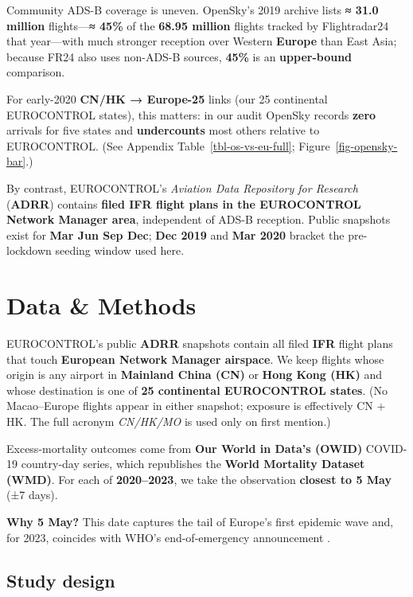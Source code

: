 \documentclass[
  authoryear,
  preprint,
  3p,
  onecolumn]{elsarticle}
\begin{document}
Community ADS-B coverage is uneven. OpenSky's 2019 archive lists
\textbf{≈ 31.0 million} flights---\textbf{≈ 45\%} of the \textbf{68.95
million} flights tracked by Flightradar24 that year---with much stronger
reception over Western \textbf{Europe} than East Asia; because FR24 also
uses non-ADS-B sources, \textbf{45\%} is an \textbf{upper-bound}
comparison. \citep{strohmeier2021}

For early-2020 \textbf{CN/HK → Europe-25} links (our 25 continental
EUROCONTROL states), this matters: in our audit OpenSky records
\textbf{zero} arrivals for five states and \textbf{undercounts} most
others relative to EUROCONTROL. (See Appendix
Table~\ref{tbl-os-vs-eu-full}; Figure~\ref{fig-opensky-bar}.)

By contrast, EUROCONTROL's \emph{Aviation Data Repository for Research}
(\textbf{ADRR}) contains \textbf{filed IFR flight plans in the
EUROCONTROL Network Manager area}, independent of ADS-B reception.
Public snapshots exist for \textbf{Mar \textbar{} Jun \textbar{} Sep
\textbar{} Dec}; \textbf{Dec 2019} and \textbf{Mar 2020} bracket the
pre-lockdown seeding window used here.

\section{Data \& Methods}\label{methods}

EUROCONTROL's public \textbf{ADRR} snapshots contain all filed
\textbf{IFR} flight plans that touch \textbf{European Network Manager
airspace}. We keep flights whose origin is any airport in
\textbf{Mainland China (CN)} or \textbf{Hong Kong (HK)} and whose
destination is one of \textbf{25 continental EUROCONTROL states}. (No
Macao--Europe flights appear in either snapshot; exposure is effectively
CN + HK. The full acronym \emph{CN/HK/MO} is used only on first
mention.)

Excess-mortality outcomes come from \textbf{Our World in Data's (OWID)}
COVID-19 country-day series, which republishes the \textbf{World
Mortality Dataset (WMD)}. For each of \textbf{2020--2023}, we take the
observation \textbf{closest to 5 May} (±7 days).

\textbf{Why 5 May?} This date captures the tail of Europe's first
epidemic wave and, for 2023, coincides with WHO's end-of-emergency
announcement \citep{who2023end}.

\subsection{Study design}\label{study-design}
\end{document}
